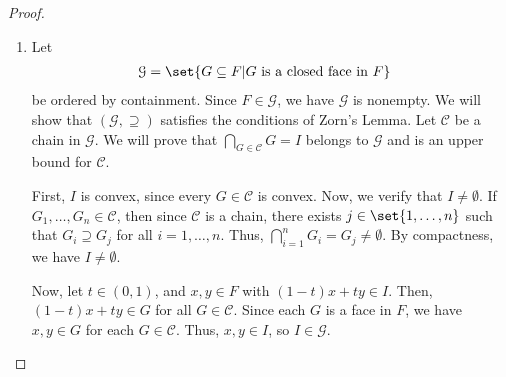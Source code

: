 \documentclass[10pt]{mypackage}
\begin{document}
\begin{proof}\hfill
  \begin{enumerate}[(1)]
    \item Let
      \begin{align*}
        \mathcal{G} &= \set{G\subseteq F | G\text{ is a closed face in }F}
      \end{align*}
      be ordered by containment. Since $F\in \mathcal{G}$, we have $\mathcal{G}$ is nonempty. We will show that $\left(\mathcal{G},\supseteq\right)$ satisfies the conditions of Zorn's Lemma. Let $\mathcal{C}$ be a chain in $\mathcal{G}$. We will prove that $\bigcap_{G\in \mathcal{C}}G = I$ belongs to $\mathcal{G}$ and is an upper bound for $\mathcal{C}$.\newline

      First, $I$ is convex, since every $G\in \mathcal{C}$ is convex. Now, we verify that $I\neq \emptyset$. If $G_1,\dots,G_n \in \mathcal{C}$, then since $\mathcal{C}$ is a chain, there exists $j\in \set{1,\dots,n}$ such that $G_i\supseteq G_j$ for all $i=1,\dots,n$. Thus, $\bigcap_{i=1}^{n}G_i = G_j \neq \emptyset$. By compactness, we have $I\neq \emptyset$.\newline

      Now, let $t\in (0,1)$, and $x,y\in F$ with $\left(1-t\right)x + ty \in I$. Then, $\left(1-t\right)x + ty\in G$ for all $G\in \mathcal{C}$. Since each $G$ is a face in $F$, we have $x,y\in G$ for each $G\in \mathcal{C}$. Thus, $x,y\in I$, so $I\in \mathcal{G}$.\newline


\end{enumerate}
\end{proof}
\end{document}
